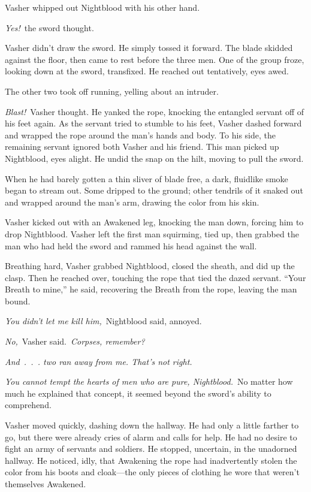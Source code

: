 Vasher whipped out Nightblood with his other hand.

\textit{Yes!}~the sword thought.

Vasher didn’t draw the sword. He simply tossed it forward. The blade skidded against the floor, then came to rest before the three men. One of the group froze, looking down at the sword, transfixed. He reached out tentatively, eyes awed.

The other two took off running, yelling about an intruder.

\textit{Blast!}~Vasher thought. He yanked the rope, knocking the entangled servant off of his feet again. As the servant tried to stumble to his feet, Vasher dashed forward and wrapped the rope around the man’s hands and body. To his side, the remaining servant ignored both Vasher and his friend. This man picked up Nightblood, eyes alight. He undid the snap on the hilt, moving to pull the sword.

When he had barely gotten a thin sliver of blade free, a dark, fluidlike smoke began to stream out. Some dripped to the ground; other tendrils of it snaked out and wrapped around the man’s arm, drawing the color from his skin.

Vasher kicked out with an Awakened leg, knocking the man down, forcing him to drop Nightblood. Vasher left the first man squirming, tied up, then grabbed the man who had held the sword and rammed his head against the wall.

Breathing hard, Vasher grabbed Nightblood, closed the sheath, and did up the clasp. Then he reached over, touching the rope that tied the dazed servant. “Your Breath to mine,” he said, recovering the Breath from the rope, leaving the man bound.

\textit{You didn’t let me kill him,}~Nightblood said, annoyed.

\textit{No,}~Vasher said.~\textit{Corpses, remember?}

\textit{And~.~.~. two ran away from me. That’s not right.}

\textit{You cannot tempt the hearts of men who are pure, Nightblood.}~No matter how much he explained that concept, it seemed beyond the sword’s ability to comprehend.

Vasher moved quickly, dashing down the hallway. He had only a little farther to go, but there were already cries of alarm and calls for help. He had no desire to fight an army of servants and soldiers. He stopped, uncertain, in the unadorned hallway. He noticed, idly, that Awakening the rope had inadvertently stolen the color from his boots and cloak—the only pieces of clothing he wore that weren’t themselves Awakened.


